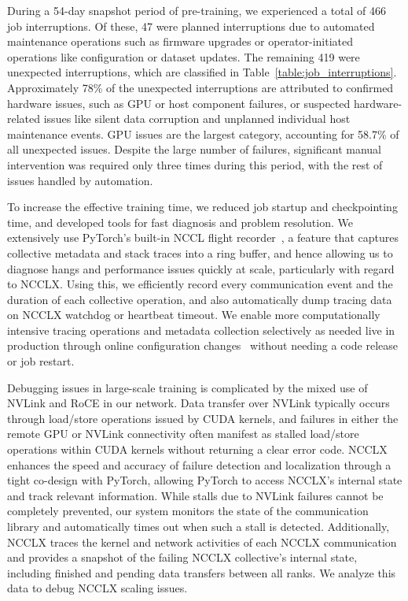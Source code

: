 During a 54-day snapshot period of pre-training, we experienced a total of 466 job interruptions. Of these, 47 were planned interruptions due to automated maintenance operations such as firmware upgrades or operator-initiated operations like configuration or dataset updates. The remaining 419 were unexpected interruptions, which are classified in Table~\ref{table:job_interruptions}.
Approximately 78\% of the unexpected interruptions are attributed to confirmed hardware issues, such as GPU or host component failures, or suspected hardware-related issues like silent data corruption and unplanned individual host maintenance events. GPU issues are the largest category, accounting for 58.7\% of all unexpected issues.  Despite the large number of failures, significant manual intervention was required only three times during this period, with the rest of issues handled by automation. 

To increase the effective training time, we reduced job startup and checkpointing time, and developed tools for fast diagnosis and problem resolution. We extensively use PyTorch's built-in NCCL flight recorder~\citep{ansel2024pytorch}, a feature that captures collective metadata and stack traces into a ring buffer, and hence allowing us to diagnose hangs and performance issues quickly at scale, particularly with regard to NCCLX. Using this, we efficiently record every communication event and the duration of each collective operation, and also automatically dump tracing data on NCCLX watchdog or heartbeat timeout. We enable more computationally intensive tracing operations and metadata collection selectively as needed live in production through online configuration changes~\citep{configerator} without needing a code release or job restart.

Debugging issues in large-scale training is complicated by the mixed use of NVLink and RoCE in our network. Data transfer over NVLink typically occurs through load/store operations issued by CUDA kernels, and failures in either the remote GPU or NVLink connectivity often manifest as stalled load/store operations within CUDA kernels without returning a clear error code. NCCLX enhances the speed and accuracy of failure detection and localization through a tight co-design with PyTorch, allowing PyTorch to access NCCLX’s internal state and track relevant information. While stalls due to NVLink failures cannot be completely prevented, our system monitors the state of the communication library and automatically times out when such a stall is detected. Additionally, NCCLX traces the kernel and network activities of each NCCLX communication and provides a snapshot of the failing NCCLX collective's internal state, including finished and pending data transfers between all ranks. We analyze this data to debug NCCLX scaling issues.

